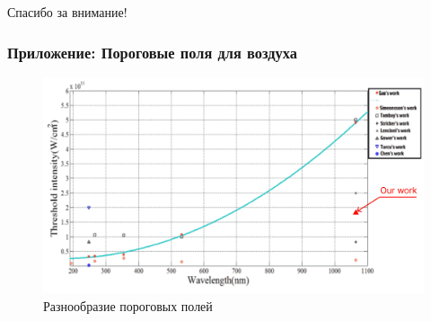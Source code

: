 \documentclass{beamer}
\begin{document}
	\begin{frame}[plain,c]
		
		\begin{center}
			\huge {} Спасибо за внимание!
		\end{center}
		
	\end{frame}
	
	\begin{frame}
		\frametitle{Приложение: Пороговые поля для воздуха}
		
		\begin{figure}
			\centering
			\includegraphics[width=\linewidth]{res/air_threshold_variety.png}
			\caption*{Разнообразие пороговых полей}
		\end{figure}
	\end{frame}
\end{document}

